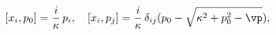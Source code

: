 \begin{equation}\label{a.4}
   [x_i, p_0] =\frac{i}\kappa\, p_i, \quad [x_i, p_j] = \frac{i}\kappa\,
\delta_{ij}(p_0 - \sqrt{\kappa^2 +p_0^2-\vp}),
\end{equation}

